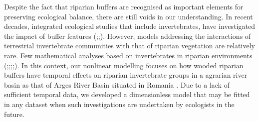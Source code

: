 \documentclass[12pt]{article}
\numberwithin{equation}{section}
\begin{document}
Despite the fact that riparian buffers are recognised as important elements for preserving ecological balance, there are still voids in our understanding. In recent decades, integrated ecological studies that include invertebrates, have investigated the impact of buffer features (\cite{forio2020small};\cite{flory1999};\cite{kawaguchi2001}). However, models addressing the interactions of terrestrial invertebrate communities with that of riparian vegetation are relatively rare. Few mathematical analyses based on invertebrates in riparian environments (\cite{wipfli1997};\cite{sabo2002};\cite{you2015};\cite{burdon2020};\cite{steward2022}). In this context, our nonlinear modelling focuses on how wooded riparian buffers have temporal effects on riparian invertebrate groups in a agrarian river basin as that of Arges River Basin situated in Romania \cite{popescu2021riparian}. Due to a lack of sufficient temporal data, we developed a dimensionless model that may be fitted in any dataset when such investigations are undertaken by ecologists in the future.\\
\vspace{-1cm}
\end{document}
